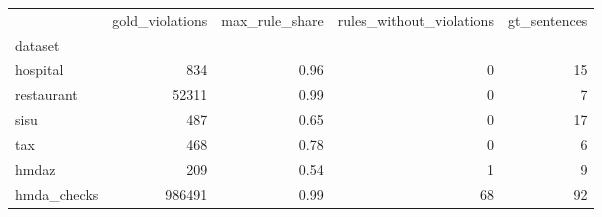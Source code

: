\begin{tabular}{lrrrr}
\toprule
 & gold_violations & max_rule_share & rules_without_violations & gt_sentences \\
dataset &  &  &  &  \\
\midrule
hospital & 834 & 0.96 & 0 & 15 \\
restaurant & 52311 & 0.99 & 0 & 7 \\
sisu & 487 & 0.65 & 0 & 17 \\
tax & 468 & 0.78 & 0 & 6 \\
hmdaz & 209 & 0.54 & 1 & 9 \\
hmda_checks & 986491 & 0.99 & 68 & 92 \\
\bottomrule
\end{tabular}
